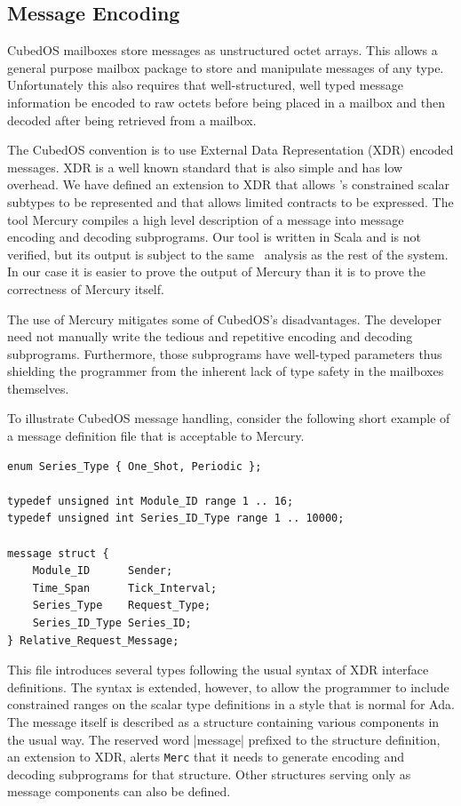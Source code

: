 
\subsection{Message Encoding}
\label{sec:architecture-message-encoding}

CubedOS mailboxes store messages as unstructured octet arrays. This allows a general purpose
mailbox package to store and manipulate messages of any type. Unfortunately this also requires
that well-structured, well typed message information be encoded to raw octets before being
placed in a mailbox and then decoded after being retrieved from a mailbox.

The CubedOS convention is to use External Data Representation (XDR) encoded messages. XDR is a
well known standard \cite{rfc-4506} that is also simple and has low overhead. We have defined an
extension to XDR that allows \SPARK's constrained scalar subtypes to be represented and that
allows limited contracts to be expressed. The tool Mercury compiles a high level description of
a message into message encoding and decoding subprograms. Our tool is written in Scala and is
not verified, but its output is subject to the same \SPARK\ analysis as the rest of the system.
In our case it is easier to prove the output of Mercury than it is to prove the correctness of
Mercury itself.

The use of Mercury mitigates some of CubedOS's disadvantages. The developer need not manually
write the tedious and repetitive encoding and decoding subprograms. Furthermore, those
subprograms have well-typed parameters thus shielding the programmer from the inherent lack of
type safety in the mailboxes themselves.

To illustrate CubedOS message handling, consider the following short example of a message
definition file that is acceptable to Mercury.

\begin{verbatim}
enum Series_Type { One_Shot, Periodic };

typedef unsigned int Module_ID range 1 .. 16;
typedef unsigned int Series_ID_Type range 1 .. 10000;

message struct {
    Module_ID      Sender;
    Time_Span      Tick_Interval;
    Series_Type    Request_Type;
    Series_ID_Type Series_ID;
} Relative_Request_Message;
\end{verbatim}

This file introduces several types following the usual syntax of XDR interface definitions. The
syntax is extended, however, to allow the programmer to include constrained ranges on the scalar
type definitions in a style that is normal for Ada. The message itself is described as a
structure containing various components in the usual way. The reserved word |message| prefixed
to the structure definition, an extension to XDR, alerts \texttt{Merc} that it needs to generate
encoding and decoding subprograms for that structure. Other structures serving only as message
components can also be defined.

